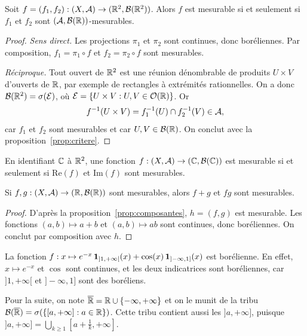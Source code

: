 \documentclass[11pt]{article}
\begin{document}
\begin{proposition}\label{prop:composantes}
Soit $f = (f_1,f_2) : (X,\mathcal{A}) \to (\mathbb{R}^2,\mathcal{B}(\mathbb{R}^2))$. Alors $f$ est mesurable si et seulement si $f_1$ et $f_2$ sont $(\mathcal{A},\mathcal{B}(\mathbb{R}))$-mesurables.
\end{proposition}

\begin{proof}
\emph{Sens direct.} Les projections $\pi_1$ et $\pi_2$ sont continues, donc boréliennes. Par composition, $f_1 = \pi_1\circ f$ et $f_2 = \pi_2 \circ f$ sont mesurables.

\emph{Réciproque.} Tout ouvert de $\mathbb{R}^2$ est une réunion dénombrable de produits $U \times V$ d'ouverts de $\mathbb{R}$, par exemple de rectangles à extrémités rationnelles. On a donc $\mathcal{B}(\mathbb{R}^2) = \sigma(\mathcal{E})$, où $\mathcal{E} = \{U \times V : U,V \in \mathcal{O}(\mathbb{R})\}$. Or
\[
  f^{-1}(U\times V) = f_1^{-1}(U) \cap f_2^{-1}(V) \in \mathcal{A},
\]
car $f_1$ et $f_2$ sont mesurables et car $U,V \in \mathcal{B}(\mathbb{R})$. On conclut avec la proposition~\ref{prop:critere}.
\end{proof}

\begin{remarque}
En identifiant $\mathbb{C}$ à $\mathbb{R}^2$, une fonction $f : (X,\mathcal{A}) \to (\mathbb{C},\mathcal{B}(\mathbb{C}))$ est mesurable si et seulement si $\mathrm{Re}(f)$ et $\mathrm{Im}(f)$ sont mesurables.
\end{remarque}

\begin{proposition}
Si $f,g : (X,\mathcal{A}) \to (\mathbb{R},\mathcal{B}(\mathbb{R}))$ sont mesurables, alors $f+g$ et $fg$ sont mesurables.
\end{proposition}

\begin{proof}
D'après la proposition~\ref{prop:composantes}, $h = (f,g)$ est mesurable. Les fonctions $(a,b) \mapsto a+b$ et $(a,b)\mapsto ab$ sont continues, donc boréliennes. On conclut par composition avec $h$.
\end{proof}

\begin{exemple}
La fonction $f : x \mapsto e^{-x}\,\mathbf{1}_{]1,+\infty[}(x) + \cos(x)\,\mathbf{1}_{]-\infty,1]}(x)$ est borélienne. En effet, $x\mapsto e^{-x}$ et $\cos$ sont continues, et les deux indicatrices sont boréliennes, car $]1,+\infty[$ et $]-\infty,1]$ sont des boréliens.
\end{exemple}

Pour la suite, on note $\overline{\mathbb{R}} = \mathbb{R} \cup \{-\infty,+\infty\}$ et on le munit de la tribu $\mathcal{B}(\overline{\mathbb{R}}) = \sigma(\{[a,+\infty] : a \in \mathbb{R}\})$. Cette tribu contient aussi les $]a,+\infty]$, puisque $]a,+\infty] = \bigcup_{k\geq 1} [a+\frac1k,+\infty]$.
\end{document}
